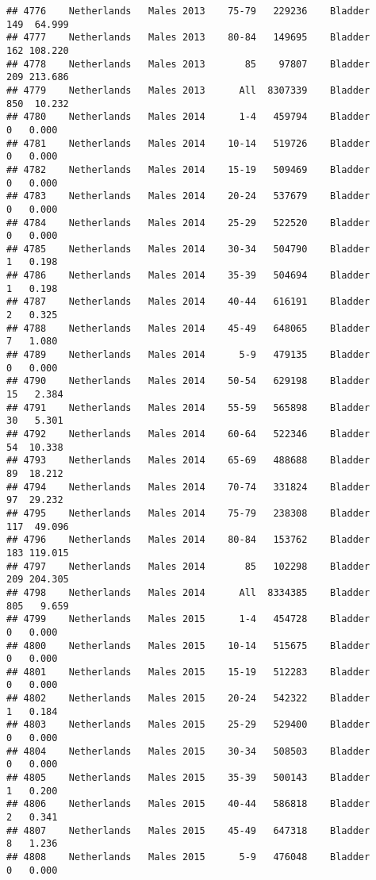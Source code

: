 \documentclass[
]{article}
\begin{document}
\begin{verbatim}
## 4776    Netherlands   Males 2013    75-79   229236    Bladder    149  64.999
## 4777    Netherlands   Males 2013    80-84   149695    Bladder    162 108.220
## 4778    Netherlands   Males 2013       85    97807    Bladder    209 213.686
## 4779    Netherlands   Males 2013      All  8307339    Bladder    850  10.232
## 4780    Netherlands   Males 2014      1-4   459794    Bladder      0   0.000
## 4781    Netherlands   Males 2014    10-14   519726    Bladder      0   0.000
## 4782    Netherlands   Males 2014    15-19   509469    Bladder      0   0.000
## 4783    Netherlands   Males 2014    20-24   537679    Bladder      0   0.000
## 4784    Netherlands   Males 2014    25-29   522520    Bladder      0   0.000
## 4785    Netherlands   Males 2014    30-34   504790    Bladder      1   0.198
## 4786    Netherlands   Males 2014    35-39   504694    Bladder      1   0.198
## 4787    Netherlands   Males 2014    40-44   616191    Bladder      2   0.325
## 4788    Netherlands   Males 2014    45-49   648065    Bladder      7   1.080
## 4789    Netherlands   Males 2014      5-9   479135    Bladder      0   0.000
## 4790    Netherlands   Males 2014    50-54   629198    Bladder     15   2.384
## 4791    Netherlands   Males 2014    55-59   565898    Bladder     30   5.301
## 4792    Netherlands   Males 2014    60-64   522346    Bladder     54  10.338
## 4793    Netherlands   Males 2014    65-69   488688    Bladder     89  18.212
## 4794    Netherlands   Males 2014    70-74   331824    Bladder     97  29.232
## 4795    Netherlands   Males 2014    75-79   238308    Bladder    117  49.096
## 4796    Netherlands   Males 2014    80-84   153762    Bladder    183 119.015
## 4797    Netherlands   Males 2014       85   102298    Bladder    209 204.305
## 4798    Netherlands   Males 2014      All  8334385    Bladder    805   9.659
## 4799    Netherlands   Males 2015      1-4   454728    Bladder      0   0.000
## 4800    Netherlands   Males 2015    10-14   515675    Bladder      0   0.000
## 4801    Netherlands   Males 2015    15-19   512283    Bladder      0   0.000
## 4802    Netherlands   Males 2015    20-24   542322    Bladder      1   0.184
## 4803    Netherlands   Males 2015    25-29   529400    Bladder      0   0.000
## 4804    Netherlands   Males 2015    30-34   508503    Bladder      0   0.000
## 4805    Netherlands   Males 2015    35-39   500143    Bladder      1   0.200
## 4806    Netherlands   Males 2015    40-44   586818    Bladder      2   0.341
## 4807    Netherlands   Males 2015    45-49   647318    Bladder      8   1.236
## 4808    Netherlands   Males 2015      5-9   476048    Bladder      0   0.000

\end{verbatim}
\end{document}

